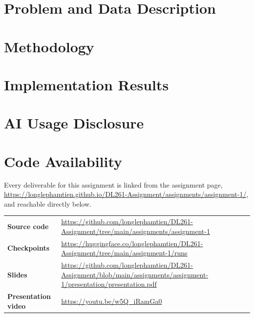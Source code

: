 \documentclass[a4paper]{article}
\theoremstyle{definition}
\begin{document}
\pagebreak
\tableofcontents
\pagebreak
\listoffigures{}
\listoftables{}
\pagebreak

\section{Problem and Data Description}
\label{sec:problem-and-data}


\section{Methodology}
\label{sec:methodology}


\section{Implementation Results}
\label{sec:results}


\section{AI Usage Disclosure}
\label{sec:ai-usage}


\section*{Code Availability}
Every deliverable for this assignment is linked from the assignment page,
\url{https://longlephamtien.github.io/DL261-Assignment/assignments/assignment-1/}, and reachable
directly below.
\noindent\begin{tabularx}{\textwidth}{lX}
\hline
\textbf{Source code} & \url{https://github.com/longlephamtien/DL261-Assignment/tree/main/assignments/assignment-1} \\
\textbf{Checkpoints} & \url{https://huggingface.co/longlephamtien/DL261-Assignment/tree/main/assignment-1/runs} \\
\textbf{Slides} & \url{https://github.com/longlephamtien/DL261-Assignment/blob/main/assignments/assignment-1/presentation/presentation.pdf} \\
\textbf{Presentation video} & \url{https://youtu.be/w5Q_iRamGa0} \\
\hline
\end{tabularx}

\printbibliography
{}
\end{document}
